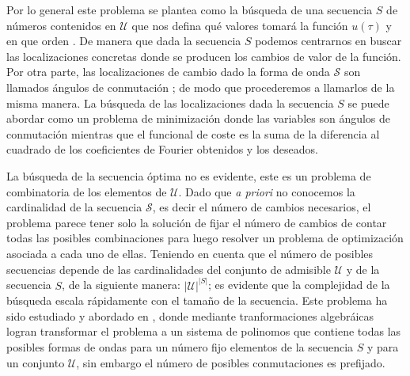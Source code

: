 Por lo general este problema se plantea como la búsqueda de una secuencia $S$ de números contenidos en $\mathcal{U}$ que nos defina qué valores tomará la función $u(\tau)$ y en que orden \cite{Konstantinou2010}.
%
De manera que dada la secuencia $S$ podemos centrarnos en buscar las localizaciones concretas donde se producen los cambios de valor de la función.
%
Por otra parte, las localizaciones de cambio dado la forma de onda $\mathcal{S}$ son llamados ángulos de conmutación \cite{Yang2015,Konstantinou2010,Sun1996}; de modo que procederemos a llamarlos de  la misma manera.
%
La búsqueda de las localizaciones dada la secuencia $S$ se puede abordar como un problema de minimización donde las variables son ángulos de conmutación mientras que el funcional de coste es la suma de la diferencia al cuadrado de los coeficientes de Fourier obtenidos y los deseados.
\newline 


La búsqueda de la secuencia óptima no es evidente, este es un problema de combinatoria de los elementos de $\mathcal{U}$. 
%
Dado que \emph{a priori} no conocemos la cardinalidad de la secuencia $\mathcal{S}$, es decir el número de cambios necesarios,  el problema parece tener solo la solución de fijar el número de cambios de contar todas las posibles combinaciones para luego resolver un problema de optimización asociada a cada uno de ellas. 
%  
Teniendo en cuenta que el número de posibles secuencias depende de las cardinalidades del conjunto de admisible $\mathcal{U}$ y de la secuencia $S$, de la siguiente manera:  $|\mathcal{U}|^{|S|}$; es evidente que la complejidad de la búsqueda escala rápidamente con el tamaño de la secuencia.
% 
Este problema ha sido estudiado y abordado en \cite{Yang2015}, donde mediante tranformaciones algebráicas logran transformar el problema a un sistema de polinomos que contiene todas las posibles formas de ondas para un número fijo elementos de la secuencia $S$ y para un conjunto $\mathcal{U}$, sin embargo el número de posibles conmutaciones es prefijado. 
%
\newline

